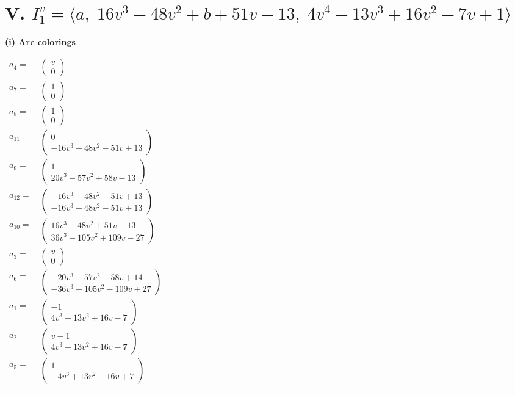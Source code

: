 \documentclass[1p]{elsarticle_modified}
\theoremstyle{definition}
\begin{document}
\centering \section*{V. $I^v_{1}= \langle a,\;16 v^3-48 v^2+b+51 v-13,\;4 v^4-13 v^3+16 v^2-7 v+1 \rangle$}
\flushleft \textbf{(i) Arc colorings}\\
\begin{tabular}{m{7pt} m{180pt} m{7pt} m{180pt} }
\flushright $a_{4}=$&$\begin{pmatrix}v\\0\end{pmatrix}$ \\
\flushright $a_{7}=$&$\begin{pmatrix}1\\0\end{pmatrix}$ \\
\flushright $a_{8}=$&$\begin{pmatrix}1\\0\end{pmatrix}$ \\
\flushright $a_{11}=$&$\begin{pmatrix}0\\-16 v^3+48 v^2-51 v+13\end{pmatrix}$ \\
\flushright $a_{9}=$&$\begin{pmatrix}1\\20 v^3-57 v^2+58 v-13\end{pmatrix}$ \\
\flushright $a_{12}=$&$\begin{pmatrix}-16 v^3+48 v^2-51 v+13\\-16 v^3+48 v^2-51 v+13\end{pmatrix}$ \\
\flushright $a_{10}=$&$\begin{pmatrix}16 v^3-48 v^2+51 v-13\\36 v^3-105 v^2+109 v-27\end{pmatrix}$ \\
\flushright $a_{3}=$&$\begin{pmatrix}v\\0\end{pmatrix}$ \\
\flushright $a_{6}=$&$\begin{pmatrix}-20 v^3+57 v^2-58 v+14\\-36 v^3+105 v^2-109 v+27\end{pmatrix}$ \\
\flushright $a_{1}=$&$\begin{pmatrix}-1\\4 v^3-13 v^2+16 v-7\end{pmatrix}$ \\
\flushright $a_{2}=$&$\begin{pmatrix}v-1\\4 v^3-13 v^2+16 v-7\end{pmatrix}$ \\
\flushright $a_{5}=$&$\begin{pmatrix}1\\-4 v^3+13 v^2-16 v+7\end{pmatrix}$\\&\end{tabular}
\end{document}
